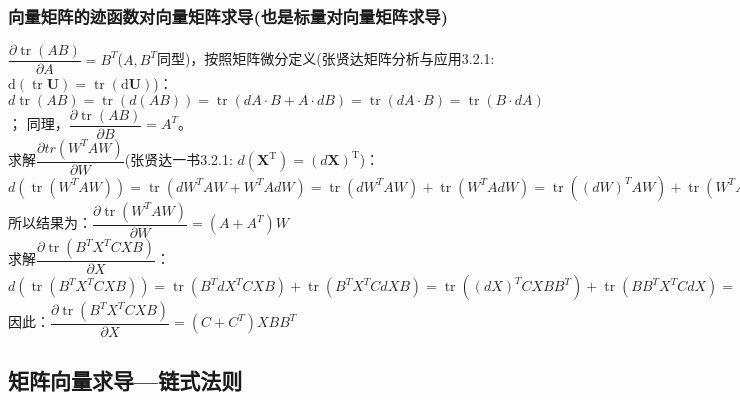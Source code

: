     \subsubsection{向量矩阵的迹函数对向量矩阵求导(也是标量对向量矩阵求导)}
    $\dfrac{\partial \operatorname{tr}(A B)}{\partial A}=B^{T}$($A,B^T$同型)，按照矩阵微分定义(张贤达矩阵分析与应用3.2.1: \quad $\mathrm{d}(\operatorname{tr} \boldsymbol{U})=\operatorname{tr}(\mathrm{d} \boldsymbol{U})$)：
    \\
    $d\operatorname{tr}(AB)=\operatorname{tr}(d(AB))=\operatorname{tr}(dA \cdot B + A\cdot dB)=\operatorname{tr}(dA \cdot B)=\operatorname{tr}(B \cdot dA)$；
    同理，$\dfrac{\partial \operatorname{tr}(A B)}{\partial B}=A^{T}$。
    \\
    求解$\dfrac{\partial t r\left(W^{T} A W\right)}{\partial W}$(张贤达一书3.2.1: $d\left(\boldsymbol{X}^{\mathrm{T}}\right)=(d \boldsymbol{X})^{\mathrm{T}}$)：
    \\
    $d\left(\operatorname{tr}\left(W^{T} A W\right)\right)=\operatorname{tr}\left(d W^{T} A W+W^{T} A d W\right)=\operatorname{tr}\left(d W^{T} A W\right)+\operatorname{tr}\left(W^{T} A d W\right)=\operatorname{tr}\left((d W)^{T} A W\right)+\operatorname{tr}\left(W^{T} A d W\right)=\operatorname{tr}\left(W^{T} A^{T} d W\right)+\operatorname{tr}\left(W^{T} A d W\right)=\operatorname{tr}\left(W^{T}\left(A+A^{T}\right) d W\right)$
    \\
    所以结果为：$\dfrac{\partial \operatorname{tr}\left(W^{T} A W\right)}{\partial W}=\left(A+A^{T}\right) W$
    \\
    求解$\dfrac{\partial \operatorname{tr}\left(B^{T} X^{T} C X B\right)}{\partial X}$：
    \\
    $d\left(\operatorname{tr}\left(B^{T} X^{T} C X B\right)\right)=\operatorname{tr}\left(B^{T} d X^{T} C X B\right)+\operatorname{tr}\left(B^{T} X^{T} C d X B\right)=\operatorname{tr}\left((d X)^{T} C X B B^{T}\right)+\operatorname{tr}\left(B B^{T} X^{T} C d X\right)=\operatorname{tr}\left(B B^{T} X^{T} C^{T} d X\right)+\operatorname{tr}\left(B B^{T} X^{T} C d X\right)=\operatorname{tr}\left(\left(B B^{T} X^{T} C^{T}+B B^{T} X^{T} C\right) d X\right)$
    \\
    因此：$\dfrac{\partial \operatorname{tr}\left(B^{T} X^{T} C X B\right)}{\partial X}=\left(C+C^{T}\right) X B B^{T}$

    \subsection{矩阵向量求导---链式法则}
